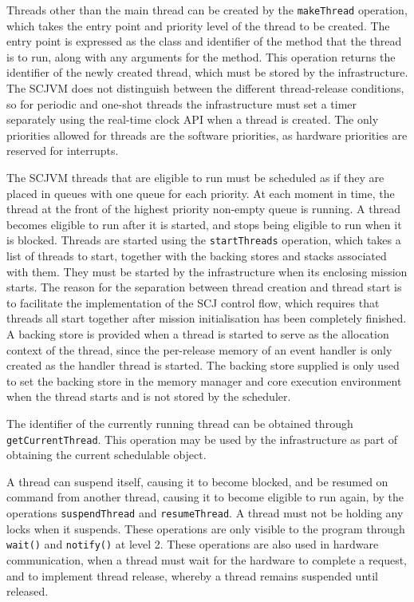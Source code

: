 Threads other than the main thread can be created by the
\texttt{makeThread} operation, which takes the entry point and
priority level of the thread to be created.
The entry point is expressed as the class and identifier of the method
that the thread is to run, along with any arguments for the method.
This operation returns the identifier of the newly created thread,
which must be stored by the infrastructure.
The SCJVM does not distinguish between the different thread-release
conditions, so for periodic and one-shot threads the infrastructure
must set a timer separately using the real-time clock API when a
thread is created.
The only priorities allowed for threads are the software priorities,
as hardware priorities are reserved for interrupts.

The SCJVM threads that are eligible to run must be scheduled as if
they are placed in queues with one queue for each priority.
At each moment in time, the thread at the front of the highest
priority non-empty queue is running.
A thread becomes eligible to run after it is started, and stops being
eligible to run when it is blocked.
Threads are started using the \texttt{start\-Threads} operation, which
takes a list of threads to start, together with the backing stores and
stacks associated with them.
They must be started by the infrastructure when its enclosing mission
starts.
The reason for the separation between thread creation and thread start
is to facilitate the implementation of the SCJ control flow, which
requires that threads all start together after mission initialisation
has been completely finished.
A backing store is provided when a thread is started to serve as the
allocation context of the thread, since the per-release memory of an
event handler is only created as the handler thread is started.
The backing store supplied is only used to set the backing store in
the memory manager and core execution environment when the thread
starts and is not stored by the scheduler.

The identifier of the currently running thread can be obtained through
\texttt{get\-Current\-Thread}.
This operation may be used by the infrastructure as part of obtaining
the current schedulable object.

A thread can suspend itself, causing it to become blocked, and be
resumed on command from another thread, causing it to become eligible
to run again, by the operations \texttt{suspend\-Thread} and
\texttt{resume\-Thread}.
A thread must not be holding any locks when it suspends.
These operations are only visible to the program through
\texttt{wait()} and \texttt{notify()} at level 2.
These operations are also used in hardware communication, when a
thread must wait for the hardware to complete a request, and to
implement thread release, whereby a thread remains suspended until
released.

